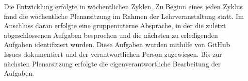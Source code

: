Die Entwicklung erfolgte in wöchentlichen Zyklen.
Zu Beginn eines jeden Zyklus fand die wöchentliche Plenarsitzung im Rahmen der Lehrveranstaltung statt.
Im Anschluss daran erfolgte eine gruppeninterne Absprache, in der die zuletzt abgeschlossenen Aufgaben besprochen und die nächsten zu erledigenden Aufgaben identifiziert wurden.
Diese Aufgaben wurden mithilfe von GitHub Issues dokumentiert und der verantwortlichen Person zugewiesen.
Bis zur nächsten Plenarsitzung erfolgte die eigenverantwortliche Bearbeitung der Aufgaben.


